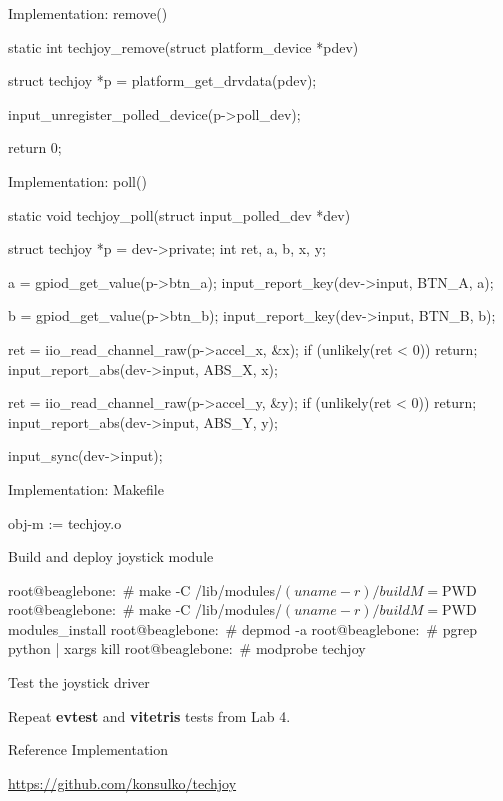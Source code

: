 \begin{frame}
	{Implementation: remove()}
	\begin{rawscriptsize}
static int techjoy_remove(struct platform_device *pdev)
{
        struct techjoy *p = platform_get_drvdata(pdev);

        input_unregister_polled_device(p->poll_dev);

        return 0;
}
	\end{rawscriptsize}
\end{frame}

\begin{frame}
	{Implementation: poll()}

	\begin{rawscriptsize}
static void techjoy_poll(struct input_polled_dev *dev)
{
        struct techjoy *p = dev->private;
        int ret, a, b, x, y;

        a = gpiod_get_value(p->btn_a);
        input_report_key(dev->input, BTN_A, a);

        b = gpiod_get_value(p->btn_b);
        input_report_key(dev->input, BTN_B, b);

        ret = iio_read_channel_raw(p->accel_x, &x);
        if (unlikely(ret < 0))
                return;
        input_report_abs(dev->input, ABS_X, x);

        ret = iio_read_channel_raw(p->accel_y, &y);
        if (unlikely(ret < 0))
                return;
        input_report_abs(dev->input, ABS_Y, y);

        input_sync(dev->input);
}
	\end{rawscriptsize}
\end{frame}

\begin{frame}
	{Implementation: Makefile}
	\begin{raw}
obj-m := techjoy.o
	\end{raw}
\end{frame}

\begin{frame}
   {Build and deploy joystick module}
	\begin{raw}
root@beaglebone:~# make -C /lib/modules/$(uname -r)/build M=$PWD
root@beaglebone:~# make -C /lib/modules/$(uname -r)/build M=$PWD modules_install
root@beaglebone:~# depmod -a
root@beaglebone:~# pgrep python | xargs kill
root@beaglebone:~# modprobe techjoy
	\end{raw}
\end{frame}

\begin{frame}
    {Test the joystick driver}

	Repeat \textbf{evtest} and \textbf{vitetris} tests from Lab 4.

\end{frame}

\begin{frame}
	{Reference Implementation}

	\url{https://github.com/konsulko/techjoy}
\end{frame}
